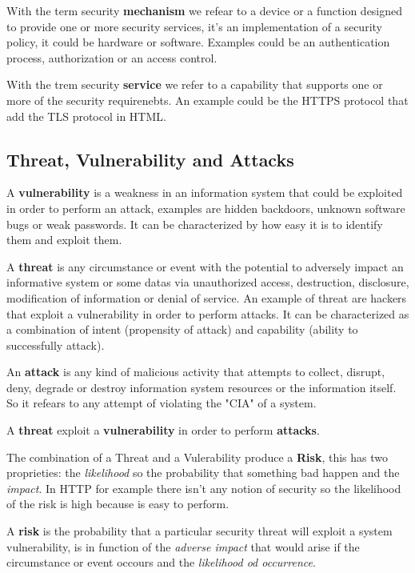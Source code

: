     With the term security \textbf{mechanism} we refear to a device or a function designed to provide one or more security services, it's an implementation of a security policy, it could be hardware or software. Examples could be an authentication process, authorization or an access control.
    
    With the trem security \textbf{service} we refer to a capability that supports one or more of the security requirenebts. An example could be the HTTPS protocol that add the TLS protocol in HTML.
    
    \subsection{Threat, Vulnerability and Attacks}
    A \textbf{vulnerability} is a weakness in an information system that could be exploited in order to perform an attack, examples are hidden backdoors, unknown software bugs or weak passwords. It can be characterized by how easy it is to identify them and exploit them.
    
    A \textbf{threat} is any circumstance or event with the potential to adversely impact an informative system or some datas via unauthorized access, destruction, disclosure, modification of information or denial of service. An example of threat are hackers that exploit a vulnerability in order to perform attacks. It can be characterized as a combination of intent (propensity of attack) and capability (ability to successfully attack).
    
    An \textbf{attack} is any kind of malicious activity that attempts to collect, disrupt, deny, degrade or destroy information system resources or the information itself. So it refears to any attempt of violating the "CIA" of a system.
    
    A \textbf{threat} exploit a \textbf{vulnerability} in order to perform \textbf{attacks}.
    
    The combination of a Threat and a Vulerability produce a \textbf{Risk}, this has two proprieties: the \textit{likelihood} so the probability that something bad happen and the \textit{impact}. In HTTP for example there isn't any notion of security so the likelihood of the risk is high because is easy to perform.
    
    A \textbf{risk} is the probability that a particular security threat will exploit a system vulnerability, is in function of the \textit{adverse impact} that would arise if the circumstance or event occours and the \textit{likelihood od occurrence}.
    
